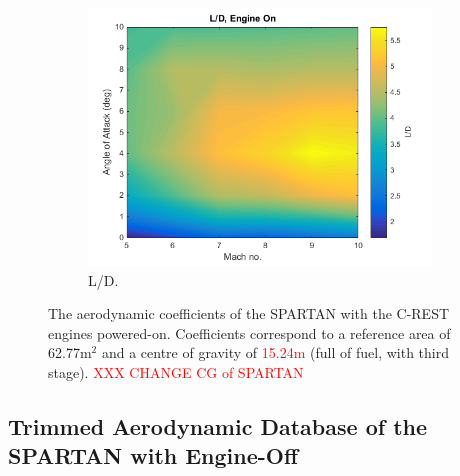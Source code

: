 \begin{figure}[ht]
\begin{subfigure}{.5\textwidth}
				\includegraphics[width=0.99\linewidth]{figures/3_vehicle_design/LD-EngineOn}
				\caption{L/D.}
				\label{fig:LD-EngineOn}
			\end{subfigure}
			\caption{The aerodynamic coefficients of the SPARTAN with the C-REST engines powered-on. Coefficients correspond to a reference area of 62.77m$^2$ and a centre of gravity of \textcolor{red}{15.24m} (full of fuel, with third stage). \textcolor{red}{XXX CHANGE CG of SPARTAN}}
			\label{fig:EngineOnAero}
		\end{figure}
		
		

\subsection{Trimmed Aerodynamic Database of the SPARTAN with Engine-Off}\label{sec:trimmedongineoff}

